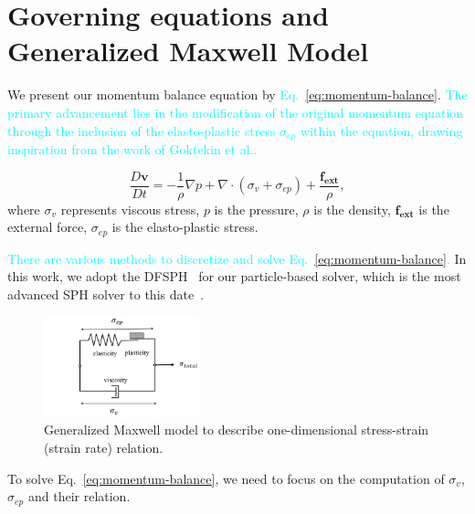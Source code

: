 \documentclass[10pt,journal,compsoc]{IEEEtran}
\newcommand{\revised}[1]{{\textcolor{cyan}{#1}}}
\begin{document}


\section{Governing equations and Generalized Maxwell Model}\label{sec:govern-eq-and-maxwell}

We present our momentum balance equation by \revised{Eq.~\ref{eq:momentum-balance}}. \revised{The primary advancement lies in the modification of the original momentum equation through the inclusion of the elasto-plastic stress $\sigma_{ep}$ within the equation, drawing inspiration from the work of Goktekin et al.\cite{Goktekin2004}.}


\begin{equation}
	\frac{D \mathbf{v}}{D t}=-\frac{1}{\rho} \nabla p+ \nabla \cdot (\sigma_v+\sigma_{ep}) +\frac{\mathbf{f_{ext}}}{\rho}, \label{eq:momentum-balance}
\end{equation}
where  $\sigma_v$ represents viscous stress, $p$ is the pressure, $\rho$ is the density, $\mathbf{f_{ext}}$ is the external force, $\sigma_{ep}$ is the elasto-plastic stress.

\revised{There are various methods to discretize and solve Eq.~\ref{eq:momentum-balance}.} In this work, we adopt the DFSPH~\cite{Bender2017-DFSPH}  for our particle-based solver, which is the most advanced SPH solver to this date~\cite{Koschier2019-Tut}.



\begin{figure}[htbp]
	\centering
	\includegraphics[width=0.4\textwidth]{pics/maxwell.png}
	\caption{Generalized Maxwell model to describe one-dimensional stress-strain (strain rate) relation.}     \label{fig:maxwell}
\end{figure}

To solve Eq.~\ref{eq:momentum-balance}, we need to focus on the computation of $\sigma_v$, $\sigma_{ep}$ and their relation.
\end{document}

